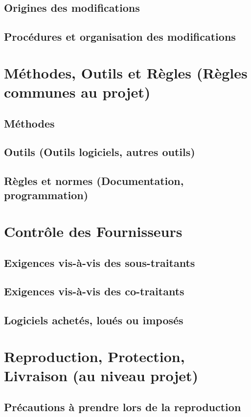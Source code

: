\subsection{Origines des modifications}
\subsection{Procédures et organisation des modifications}

\section{Méthodes, Outils et Règles (Règles communes au projet)}
\subsection{Méthodes}
\subsection{Outils (Outils logiciels, autres outils)}
\subsection{Règles et normes   (Documentation, programmation)}		

\section{Contrôle des Fournisseurs}
\subsection{Exigences vis-à-vis des sous-traitants}
\subsection{Exigences vis-à-vis des co-traitants}
\subsection{Logiciels achetés, loués ou imposés}

\section{Reproduction, Protection, Livraison (au niveau projet)}
\subsection{Précautions à prendre lors de la reproduction}
